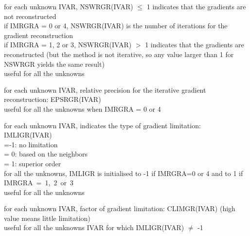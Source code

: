 {for each unknown IVAR, NSWRGR(IVAR) $\leqslant$ 1 indicates that the
gradients are not reconstructed\\
\hspace*{1.3cm}if IMRGRA = 0 or 4, NSWRGR(IVAR) is the number of
iterations for the gradient reconstruction\\
\hspace*{1.3cm}if IMRGRA = 1, 2 or 3, NSWRGR(IVAR) $>$ 1 indicates that
the gradients are reconstructed (but the method is not iterative, so any value
larger than 1 for NSWRGR yields the same result)\\
useful for all the unknowns}

{for each unknown IVAR, relative precision for the iterative gradient
reconstruction: EPSRGR(IVAR)\\
useful for all the unknowns when IMRGRA = 0 or 4}

{for each unknown IVAR, indicates the type of gradient limitation:
IMLIGR(IVAR)\\
\hspace*{1.3cm}=-1: no limitation\\
\hspace*{1.3cm}= 0: based on the neighbors\\
\hspace*{1.3cm}= 1: superior order\\
for all the unknowns, IMLIGR is initialised to -1 if IMRGRA=0 or 4 and to 1 if
\mbox{IMRGRA = 1, 2 or 3}\\
useful for all the unknowns}

{for each unknown IVAR, factor of gradient limitation: CLIMGR(IVAR) (high
value means little limitation)\\
useful for all the unknowns IVAR for which IMLIGR(IVAR) $\ne$ -1}

